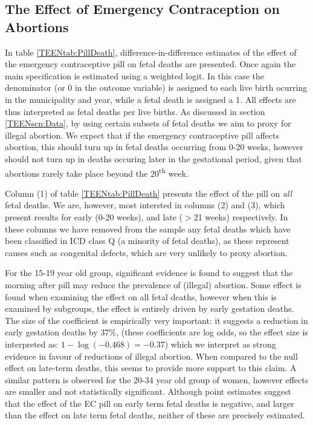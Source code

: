 \subsection{The Effect of Emergency Contraception on Abortions}
\label{TEENsscn:rabortion}
In table \ref{TEENtab:PillDeath}, difference-in-difference estimates of the 
effect of the emergency contraceptive pill on fetal deaths are presented.  Once
again the main specification is estimated using a weighted logit. In this case 
the denominator (or 0 in the outcome variable) is assigned to each live birth
ocurring in the municipality and year, while a fetal death is assigned a 1. All 
effects are thus interpreted as fetal deaths per live births. As discussed in 
section \ref{TEENscn:Data}, by using certain subsets of fetal deaths we aim to 
proxy for illegal abortion.  We expect that if the emergency contraceptive pill 
affects abortion, this should turn up in fetal deaths occurring from 0-20 weeks, 
however should not turn up in deaths occuring later in the gestational period, 
given that abortions rarely take place beyond the 20\textsuperscript{th} week.

Column (1) of table \ref{TEENtab:PillDeath} presents the effect of the pill on
\emph{all} fetal deaths.  We are, however, most intersted in columns (2) and (3),
which present results for early (0-20 weeks), and late ($>$21 weeks) 
respectively.  In these columns we have removed from the sample any fetal deaths
which have been classified in ICD class Q (a minority of fetal deaths), as these 
represent causes such as congenital defects, which are very unlikely to proxy
abortion.

For the 15-19 year old group, significant evidence is found to suggest that 
the morning after pill may reduce the prevalence of (illegal) abortion.  Some
effect is found when examining the effect on all fetal deaths, however when 
this is examined by subgroups, the effect is entirely driven by early gestation
deaths.  The size of the coefficient is empirically very important: it 
suggests a reduction in early gestation deaths by 37\%, (these coefficients are
log odds, so the effect size is interpreted as: $1-\log(-0.468)=-0.37$) which we 
interpret as strong evidence in favour of reductions of illegal abortion.  When 
compared to the null effect on late-term deaths, this seems to provide more 
support to this claim. A similar pattern is observed for the 20-34 year old group 
of women, however effects are smaller and not statistically significant. Although
point estimates suggest that the effect of the EC pill on early term fetal deaths
is negative, and larger than the effect on late term fetal deaths, neither of 
these are precisely estimated.  

